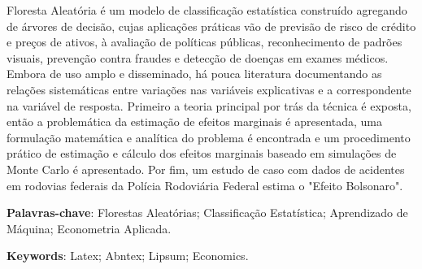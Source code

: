%
%

\begin{resumo}

Floresta Aleatória é um modelo de classificação estatística construído agregando de árvores de decisão, cujas aplicações práticas vão de previsão de risco de crédito e preços de ativos, à avaliação de políticas públicas, reconhecimento de padrões visuais, prevenção contra fraudes e detecção de doenças em exames médicos. Embora de uso amplo e disseminado, há pouca literatura documentando as relações sistemáticas entre variações nas variáveis explicativas e a correspondente na variável de resposta. Primeiro a teoria principal por trás da técnica é exposta, então a problemática da estimação de efeitos marginais é apresentada, uma formulação matemática e analítica do problema é encontrada e um procedimento prático de estimação e cálculo dos efeitos marginais baseado em simulações de Monte Carlo é apresentado. Por fim, um estudo de caso com dados de acidentes em rodovias federais da Polícia Rodoviária Federal estima o "Efeito Bolsonaro". 


\textbf{Palavras-chave}: Florestas Aleatórias; Classificação Estatística; Aprendizado de Máquina; Econometria Aplicada. %
\end{resumo}


\begin{resumo}[ABSTRACT] %
	


\textbf{Keywords}: Latex; Abntex; Lipsum; Economics. 	
\end{resumo}



